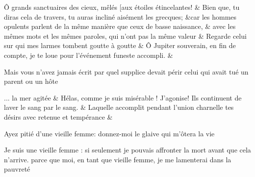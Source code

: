 \documentclass[12pt,onecolumn,twoside,a4paper]{memoir}
\begin{document}
\begin{pairs}
\begin{Rightside}
                         \stanza 
                     Ô grands sanctuaires des cieux, mêlés [aux étoiles étincelantes! \&
                         \stanza Bien que, tu diras cela de travers, tu auras incliné aisément les
                              grecques; &car les hommes opulents parlent de la même manière que ceux de basse
                              naissance, &
                     avec les mêmes mots et les mêmes paroles, qui n’ont pas la même
                              valeur \&
                         \stanza 
                     Regarde celui sur qui mes larmes tombent goutte à goutte \&
                         \stanza 
                      Ô Jupiter souverain, en fin de compte, je te loue pour l’événement
                              funeste accompli. \&
                        
                           Mais vous n’avez jamais écrit par quel supplice devait périr celui qui
                              avait tué un 
                           parent ou un hôte
                        
                         \stanza 
                     ... la mer agitée  \&
                         \stanza 
                     Hélas, comme je suis misérable ! J’agonise! Ils continuent de laver le
                              sang par le sang. \&
                         \stanza 
                     Laquelle accomplit pendant l’union charnelle tes désirs avec retenue
                              et tempérance \&
                        
                           Ayez pitié d’une vieille femme: 
                           donnez-moi le glaive qui m’ôtera la vie
                        
                        
                           Je suis une vieille femme : si seulement je pouvais affronter la mort
                              avant que cela 
                           n’arrive. parce que moi, en tant que vieille femme, je me lamenterai
                              dans la pauvreté 
                        
                     
                  \endnumbering
		\end{Rightside}
               \end{pairs}
	\Columns
            
            
\end{document}
